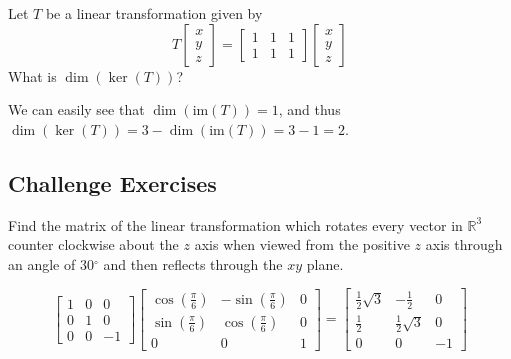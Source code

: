 \documentclass{ximera}
\begin{document}
\begin{problem}\label{prb:6.31}
 Let $T$ be a linear transformation given by
\[
T \left[ \begin{array}{r}
x\\
y \\
z
\end{array}\right] = \left[ \begin{array}{rrr}
1 & 1 & 1 \\
1 & 1 & 1
\end{array}\right]
\left[ \begin{array}{r}
x\\
y \\
z
\end{array}\right]
\]
What is $\dim  ( \ker \left( T \right) )$?

\begin{hint}
We can easily see that $\dim  ( \mbox{im} \left( T \right) ) =1$, and thus
$\dim  ( \ker \left( T \right) ) = 3 - \dim  ( \mbox{im} \left( T \right) ) = 3- 1 = 2$.
\end{hint}
\end{problem}

\subsection*{Challenge Exercises}

\begin{problem}\label{prb:6.25} Find the matrix of the linear transformation which rotates every
vector in $\mathbb{R}^{3}$ counter clockwise about the $z$ axis when viewed
from the positive $z$ axis through an angle of 30$^{\circ }$ and then
reflects through the $xy$ plane.
\begin{hint}
\[
\left[
\begin{array}{rrr}
1 & 0 & 0 \\
0 & 1 & 0 \\
0 & 0 & -1
\end{array}
\right] \left[
\begin{array}{ccc}
\cos \left( \frac{\pi }{6}\right)  & -\sin \left( \frac{\pi }{6}\right)  & 0
\\
\sin \left( \frac{\pi }{6}\right)  & \cos \left( \frac{\pi }{6}\right)  & 0
\\
0 & 0 & 1
\end{array}
\right] = \left[
\begin{array}{ccc}
\frac{1}{2}\sqrt{3} & -\frac{1}{2} & 0 \\
\frac{1}{2} & \frac{1}{2}\sqrt{3} & 0 \\
0 & 0 & -1
\end{array}
\right]
\]
\end{hint}
\end{problem}
\end{document}
